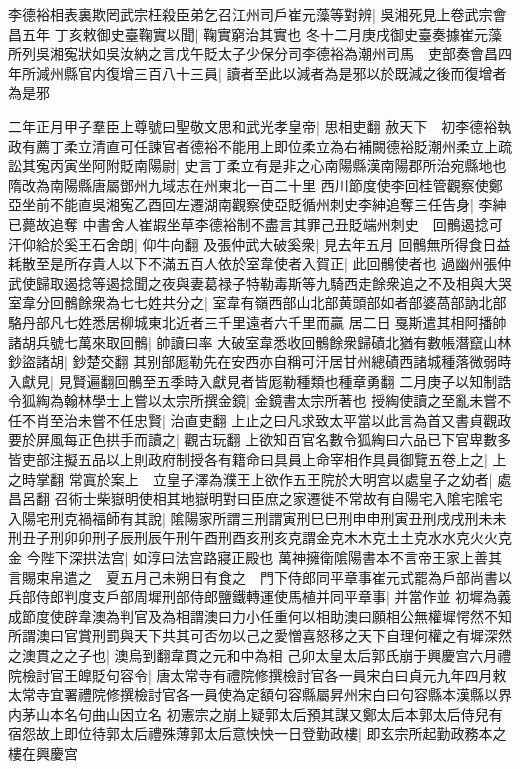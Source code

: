 李德裕相表裏欺罔武宗枉殺臣弟乞召江州司戶崔元藻等對辨|{
	吳湘死見上卷武宗會昌五年}
丁亥敕御史臺鞠實以聞|{
	鞠實窮治其實也}
冬十二月庚戌御史臺奏據崔元藻所列吳湘寃狀如吳汝納之言戊午貶太子少保分司李德裕為潮州司馬　吏部奏會昌四年所減州縣官内復增三百八十三員|{
	讀者至此以減者為是邪以於既減之後而復增者為是邪}


二年正月甲子羣臣上尊號曰聖敬文思和武光孝皇帝|{
	思相吏翻}
赦天下　初李德裕執政有薦丁柔立清直可任諫官者德裕不能用上即位柔立為右補闕德裕貶潮州柔立上疏訟其寃丙寅坐阿附貶南陽尉|{
	史言丁柔立有是非之心南陽縣漢南陽郡所治宛縣地也隋改為南陽縣唐屬鄧州九域志在州東北一百二十里}
西川節度使李回桂管觀察使鄭亞坐前不能直吳湘寃乙酉回左遷湖南觀察使亞貶循州刺史李紳追奪三任告身|{
	李紳已薨故追奪}
中書舍人崔嘏坐草李德裕制不盡言其罪己丑貶端州刺史　回鶻遏捻可汗仰給於奚王石舍朗|{
	仰牛向翻}
及張仲武大破奚衆|{
	見去年五月}
回鶻無所得食日益耗散至是所存貴人以下不滿五百人依於室韋使者入賀正|{
	此回鶻使者也}
過幽州張仲武使歸取遏捻等遏捻聞之夜與妻葛禄子特勒毒斯等九騎西走餘衆追之不及相與大哭室韋分回鶻餘衆為七七姓共分之|{
	室韋有嶺西部山北部黄頭部如者部婆萵部訥北部駱丹部凡七姓悉居柳城東北近者三千里遠者六千里而贏}
居二日戛斯遣其相阿播帥諸胡兵號七萬來取回鶻|{
	帥讀曰率}
大破室韋悉收回鶻餘衆歸磧北猶有數帳潛竄山林鈔盜諸胡|{
	鈔楚交翻}
其别部厖勒先在安西亦自稱可汗居甘州總磧西諸城種落微弱時入獻見|{
	見賢遍翻回鶻至五季時入獻見者皆厖勒種類也種章勇翻}
二月庚子以知制誥令狐綯為翰林學士上嘗以太宗所撰金鏡|{
	金鏡書太宗所著也}
授綯使讀之至亂未嘗不任不肖至治未嘗不任忠賢|{
	治直吏翻}
上止之曰凡求致太平當以此言為首又書貞觀政要於屏風每正色拱手而讀之|{
	觀古玩翻}
上欲知百官名數令狐綯曰六品已下官卑數多皆吏部注擬五品以上則政府制授各有籍命曰具員上命宰相作具員御覽五卷上之|{
	上之時掌翻}
常寘於案上　立皇子澤為濮王上欲作五王院於大明宫以處皇子之幼者|{
	處昌呂翻}
召術士柴嶽明使相其地嶽明對曰臣庶之家遷徙不常故有自陽宅入隂宅隂宅入陽宅刑克禍福師有其說|{
	隂陽家所謂三刑謂寅刑巳巳刑申申刑寅丑刑戌戌刑未未刑丑子刑卯卯刑子辰刑辰午刑午酉刑酉亥刑亥克謂金克木木克土土克水水克火火克金}
今陛下深拱法宫|{
	如淳曰法宫路寢正殿也}
萬神擁衛隂陽書本不言帝王家上善其言賜束帛遣之　夏五月己未朔日有食之　門下侍郎同平章事崔元式罷為戶部尚書以兵部侍郎判度支戶部周墀刑部侍郎鹽鐵轉運使馬植并同平章事|{
	并當作並}
初墀為義成節度使辟韋澳為判官及為相謂澳曰力小任重何以相助澳曰願相公無權墀愕然不知所謂澳曰官賞刑罰與天下共其可否勿以己之愛憎喜怒移之天下自理何權之有墀深然之澳貫之之子也|{
	澳烏到翻韋貫之元和中為相}
己卯太皇太后郭氏崩于興慶宫六月禮院檢討官王皥貶句容令|{
	唐太常寺有禮院修撰檢討官各一員宋白曰貞元九年四月敕太常寺宜署禮院修撰檢討官各一員使為定額句容縣屬昇州宋白曰句容縣本漢縣以界内茅山本名句曲山因立名}
初憲宗之崩上疑郭太后預其謀又鄭太后本郭太后侍兒有宿怨故上即位待郭太后禮殊薄郭太后意怏怏一日登勤政樓|{
	即玄宗所起勤政務本之樓在興慶宫}
